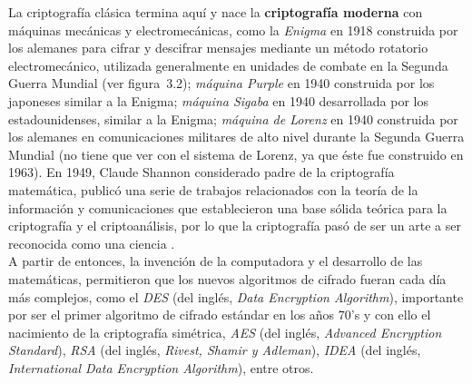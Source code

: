 La criptografía clásica termina aquí y nace la \textbf{criptografía moderna} con máquinas mecánicas y electromecánicas, como la \textit{Enigma} en 1918 construida por los alemanes para cifrar y descifrar mensajes mediante un método rotatorio electromecánico, utilizada generalmente en unidades de combate en la Segunda Guerra Mundial (ver figura~3.2); \textit{máquina Purple} en 1940 construida por los japoneses similar a la Enigma; \textit{máquina Sigaba} en 1940 desarrollada por los estadounidenses, similar a la Enigma; \textit{máquina de Lorenz} en 1940 construida por los alemanes en comunicaciones militares de alto nivel durante la Segunda Guerra Mundial (no tiene que ver con el sistema de Lorenz, ya que éste fue construido en 1963). En 1949, Claude Shannon considerado padre de la criptografía matemática, publicó una serie de trabajos relacionados con la teoría de la información y comunicaciones que establecieron una base sólida teórica para la criptografía y el criptoanálisis, por lo que la criptografía pasó de ser un arte a ser reconocida como una ciencia \cite{S_1948,S_1949}. \\

A partir de entonces, la invención de la computadora y el desarrollo de las matemáticas, permitieron que los nuevos algoritmos de cifrado fueran cada día más complejos, como el \textit{DES} (del inglés, \textit{Data Encryption Algorithm}), importante por ser el primer algoritmo de cifrado estándar en los años 70's y con ello el nacimiento de la criptografía simétrica, \textit{AES} (del inglés, \textit{Advanced Encryption Standard}), \textit{RSA} (del inglés, \textit{Rivest, Shamir y Adleman}), \textit{IDEA} (del inglés, \textit{International Data Encryption Algorithm}), entre otros.\\

